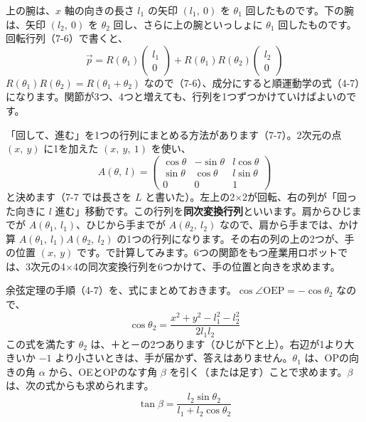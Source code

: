 \label{ph:力-7:sec7}
上の腕は、$x$ 軸の向きの長さ $l_1$ の矢印 $(l_1,\ 0)$ を $\theta_1$ 回したものです。下の腕は、矢印 $(l_2,\ 0)$ を $\theta_2$ 回し、さらに上の腕といっしょに $\theta_1$ 回したものです。回転行列（7-6）で書くと、
\[\vec p=R(\theta_1)\begin{pmatrix}l_1\\0\end{pmatrix}+R(\theta_1)R(\theta_2)\begin{pmatrix}l_2\\0\end{pmatrix}\]
$R(\theta_1)R(\theta_2)=R(\theta_1+\theta_2)$ なので（7-6）、成分にすると順運動学の式（4-7）になります。関節が3つ、4つと増えても、行列を1つずつかけていけばよいのです。

「回して、進む」を1つの行列にまとめる方法があります（7-7）。2次元の点 $(x,\ y)$ に1を加えた $(x,\ y,\ 1)$ を使い、
\[A(\theta,\ l)=\begin{pmatrix}\cos\theta&-\sin\theta&l\cos\theta\\ \sin\theta&\cos\theta&l\sin\theta\\ 0&0&1\end{pmatrix}\]
と決めます（7-7 では長さを $L$ と書いた）。左上の2×2が回転、右の列が「回った向きに $l$ 進む」移動です。この行列を\textbf{同次変換行列}といいます。肩からひじまでが $A(\theta_1,\ l_1)$、ひじから手までが $A(\theta_2,\ l_2)$ なので、肩から手までは、かけ算 $A(\theta_1,\ l_1)A(\theta_2,\ l_2)$ の1つの行列になります。その右の列の上の2つが、手の位置 $(x,\ y)$ です。で計算してみます。6つの関節をもつ産業用ロボットでは、3次元の4×4の同次変換行列を6つかけて、手の位置と向きを求めます。

余弦定理の手順（4-7）を、式にまとめておきます。$\cos\angle\mathrm{OEP}=-\cos\theta_2$ なので、
\[\cos\theta_2=\frac{x^2+y^2-l_1^2-l_2^2}{2l_1l_2}\]
この式を満たす $\theta_2$ は、＋と－の2つあります（ひじが下と上）。右辺が1より大きいか $-1$ より小さいときは、手が届かず、答えはありません。$\theta_1$ は、OPの向きの角 $\alpha$ から、OEとOPのなす角 $\beta$ を引く（または足す）ことで求めます。$\beta$ は、次の式からも求められます。
\[ \tan\beta=\frac{l_2\sin\theta_2}{l_1+l_2\cos\theta_2} \]

